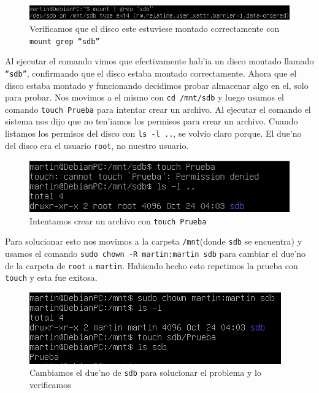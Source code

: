 \documentclass[11pt]{article}
\begin{document}
		\begin{figure}[H]
    			\centering
    			\includegraphics[scale=0.65]{Images/rsync/rsync_disk_check.PNG}
    			\caption{Verificamos que el disco este estuviese montado correctamente con \texttt{mount \textbar\/ grep ``sdb''}}
    			\label{fig:rsync_disk_check}
		\end{figure}

		Al ejecutar el comando vimos que efectivamente hab'ia un disco montado llamado \texttt{``sdb''}, confirmando que el disco estaba montado correctamente. Ahora que el disco estaba montado y funcionando decidimos probar almacenar algo en el, solo para probar. Nos movimos a el mismo con \texttt{cd /mnt/sdb} y luego usamos el comando \texttt{touch Prueba} para intentar crear un archivo. Al ejecutar el comando el sistema nos dijo que no ten'iamos los permisos para crear un archivo. Cuando listamos los permisos del disco con \texttt{ls -l ..}, se volvio claro porque. El due'no del disco era el usuario \texttt{root}, no nuestro usuario.

		\begin{figure}[H]
    			\centering
    			\includegraphics[scale=0.75]{Images/rsync/rsync_disk_touch.PNG}
    			\caption{Intentamos crear un archivo con \texttt{touch Prueba}}
    			\label{fig:rsync_disk_touch}
		\end{figure}

		Para solucionar esto nos movimos a la carpeta \texttt{/mnt}(donde \texttt{sdb} se encuentra) y usamos el comando \texttt{sudo chown -R martin:martin sdb} para cambiar el due'no de la carpeta de \texttt{root} a \texttt{martin}. Habiendo hecho esto repetimos la prueba con \texttt{touch} y esta fue exitosa.

		\begin{figure}[H]
    			\centering
    			\includegraphics[scale=0.75]{Images/rsync/rsync_disk_works.PNG}
    			\caption{Cambiamos el due'no de \texttt{sdb} para solucionar el problema y lo verificamos}
    			\label{fig:rsync_disk_works}
		\end{figure}
\end{document}

